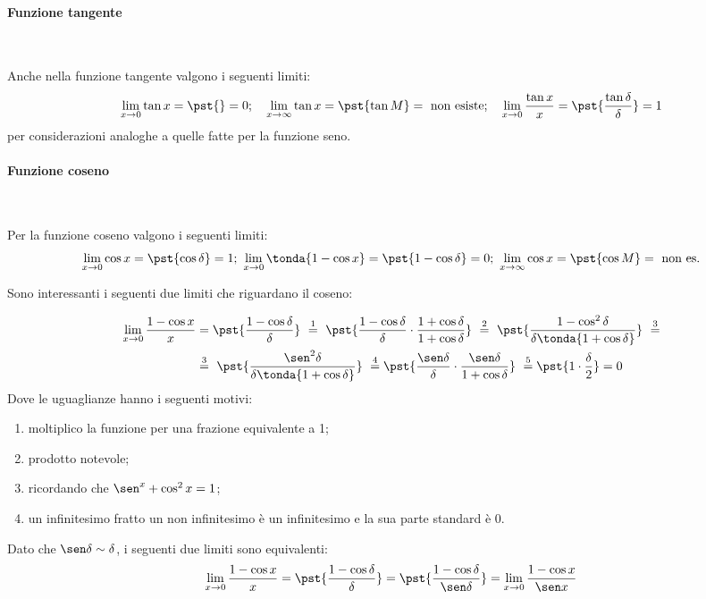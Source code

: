 \paragraph{Funzione tangente}~

Anche nella funzione tangente valgono i seguenti limiti:
\[\lim_{x \rightarrow 0}{\tan x} = \pst{} = 0; \quad
\lim_{x \rightarrow \infty}{\tan x} = \pst{\tan M} = 
                                      \text{ non esiste}; \quad
\lim_{x \rightarrow 0}\frac{\tan x}{x} = \pst{\frac{\tan \delta}{\delta}} 
                                       = 1\]
per considerazioni analoghe a quelle fatte per la funzione seno.

\paragraph{Funzione coseno}~

Per la funzione coseno valgono i seguenti limiti:
\[\lim_{x \rightarrow 0}{\cos x} = \pst{\cos \delta} = 1; ~
\lim_{x \rightarrow 0}\tonda{1-\cos x} = \pst{1-\cos \delta} = 0; ~
\lim_{x \rightarrow \infty}{\cos x} = \pst{\cos M} = \text{ non es.}\]

Sono interessanti i seguenti due limiti che riguardano il coseno:

\begin{align*}
 \lim_{x \rightarrow 0} \frac{1-\cos x}{x} &=
 \pst{\frac{1-\cos \delta}{\delta}}
~ \stackrel{1}{=} ~  
 \pst{\frac{1-\cos \delta}{\delta} \cdot 
      \frac{1+\cos \delta}{1+\cos \delta}}
~ \stackrel{2}{=} ~ 
 \pst{\frac{1-\cos^2 \delta}{\delta \tonda{1+\cos \delta}}}~ 
\stackrel{3}{=} \\
& \stackrel{3}{=} ~
 \pst{\frac{\sen^2 \delta}{\delta \tonda{1+\cos \delta}}}
~ \stackrel{4}{=}
 \pst{\frac{\sen \delta}{\delta} \cdot 
      \frac{\sen \delta}{1+\cos \delta}}
~ \stackrel{5}{=}
 \pst{1 \cdot \frac{\delta}{2}} = 0
\end{align*}
Dove le uguaglianze hanno i seguenti motivi:
\begin{enumerate} [nosep]
 \item moltiplico la funzione per una frazione equivalente a 1;
 \item prodotto notevole;
 \item ricordando che \(\sen^x + \cos^2 x = 1\);
 \item un infinitesimo fratto un non infinitesimo è un infinitesimo 
e la sua parte standard è 0.
\end{enumerate}

\begin{osservazione}
Dato che \(\sen \delta \sim \delta\), i seguenti due limiti sono 
equivalenti:
\[\lim_{x \rightarrow 0} \frac{1-\cos x}{x} =
 \pst{\frac{1-\cos \delta}{\delta}} =
 \pst{\frac{1-\cos \delta}{\sen \delta}} =
 \lim_{x \rightarrow 0} \frac{1-\cos x}{\sen x}\]
\end{osservazione}


